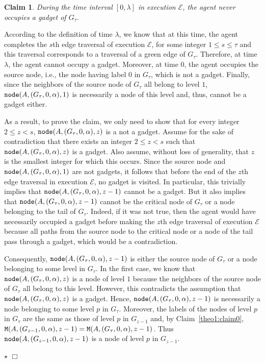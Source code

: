 \documentclass[11pt]{article}
\newtheorem{claim}{Claim}[section]
\newcommand{\qed}{\hfill $\Box$ \bigbreak}
\newenvironment{proof}{\noindent {\bf Proof.}}{\qed}
\newenvironment{proofclaim}{\noindent{\bf Proof of the claim.}}{\hfill$\star$}
\begin{document}
{\begin{proof}
\begin{claim}
\label{theo1:claim1}
During the time interval $[0,\lambda]$ in execution $\mathcal{E}$, the agent never occupies a gadget of $G_{\tau}$.
\end{claim}

\begin{proofclaim}
According to the definition of time $\lambda$, we know that at this time, the agent completes the $s$th edge traversal of execution $\mathcal{E}$, for some integer $1\leq s \leq\tau$ and this traversal corresponds to a traversal of a green edge of $G_{\tau}$. Therefore, at time $\lambda$, the agent cannot occupy a gadget. Moreover, at time $0$, the agent occupies the source node, i.e., the node having label $0$ in $G_{\tau}$, which is not a gadget. Finally, since the neighbors of the source node of $G_{\tau}$ all belong to level $1$, ${\tt node}(A,(G_{\tau},0,\alpha),1)$ is necessarily a node of this level and, thus, cannot be a gadget either.

As a result, to prove the claim, we only need to show that for every integer $2\leq z<s$, ${\tt node}(A,(G_{\tau},0,\alpha),z)$ is a not a gadget. Assume for the sake of contradiction that there exists an integer $2\leq z<s$ such that ${\tt node}(A,(G_{\tau},0,\alpha),z)$ is a gadget. Also assume, without loss of generality, that $z$ is the smallest integer for which this occurs. Since the source node and ${\tt node}(A,(G_{\tau},0,\alpha),1)$ are not gadgets, it follows that before the end of the $z$th edge traversal in execution $\mathcal{E}$, no gadget is visited. In particular, this trivially implies that ${\tt node}(A,(G_{\tau},0,\alpha),z-1)$ cannot be a gadget. But it also implies that ${\tt node}(A,(G_{\tau},0,\alpha),z-1)$ cannot be the critical node of $G_{\tau}$ or a node belonging to the tail of $G_{\tau}$. Indeed, if it was not true, then the agent would have necessarily occupied a gadget before making the $z$th edge traversal of execution $\mathcal{E}$ because all paths from the source node to the critical node or a node of the tail pass through a gadget, which would be a contradiction. 

Consequently, ${\tt node}(A,(G_{\tau},0,\alpha),z-1)$ is either the source node of $G_{\tau}$ or a node belonging to some level in $G_{\tau}$. In the first case, we know that ${\tt node}(A,(G_{\tau},0,\alpha),z)$ is a node of level $1$ because the neighbors of the source node of $G_{\tau}$ all belong to this level. However, this contradicts the assumption that ${\tt node}(A,(G_{\tau},0,\alpha),z)$ is a gadget. Hence, ${\tt node}(A,(G_{\tau},0,\alpha),z-1)$ is necessarily a node belonging to some level $p$ in $G_{\tau}$. Moreover, the labels of the nodes of level $p$ in $G_{\tau}$ are the same as those of level $p$ in $G_{z-1}$ and, by Claim~\ref{theo1:claim0}, ${\tt M}(A,(G_{z-1},0,\alpha),z-1)={\tt M}(A,(G_\tau,0,\alpha),z-1)$. Thus ${\tt node}(A,(G_{z-1},0,\alpha),z-1)$ is a node of level $p$ in $G_{z-1}$.


\end{proofclaim}
\end{proof}}
\end{document}
